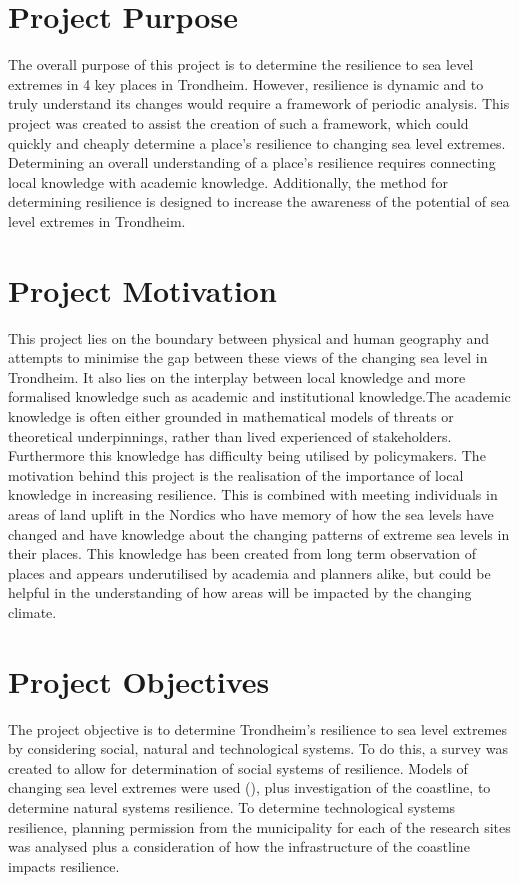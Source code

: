 \paragraph{}

\section{Project Purpose}
The overall purpose of this project is to determine the resilience to sea level extremes in 4 key places in Trondheim. However, resilience is dynamic and to truly understand its changes would require a framework of periodic analysis. This project was created to assist the creation of such a framework, which could quickly and cheaply determine a place's resilience to changing sea level extremes. Determining an overall understanding of a place's resilience requires connecting local knowledge with academic knowledge. Additionally, the method for determining resilience is designed to increase the awareness of the potential of sea level extremes in Trondheim. 

\section{Project Motivation}
 This project lies on the boundary between physical and human geography and attempts to minimise the gap between these views of the changing sea level in Trondheim. It also lies on the interplay between local knowledge and more formalised knowledge such as academic and institutional knowledge.The academic knowledge is often either grounded in mathematical models of threats or theoretical underpinnings, rather than lived experienced of stakeholders. Furthermore this knowledge has difficulty being utilised by policymakers. The motivation behind this project is the realisation of the importance of local knowledge in increasing resilience. This is combined with meeting individuals in areas of land uplift in the Nordics who have memory of how the sea levels have changed and have knowledge about the changing patterns of extreme sea levels in their places. This knowledge has been created from long term observation of places and appears underutilised by academia and planners alike, but could be helpful in the understanding of how areas will be impacted by the changing climate. 



\section{Project Objectives}
The project objective is to determine Trondheim's resilience to sea level extremes by considering social, natural and technological systems. To do this, a survey was created to allow for determination of social systems of resilience.  Models of changing sea level extremes were used (\cite{kartverket_se_2020}), plus investigation of the coastline, to determine natural systems resilience. To determine technological systems resilience, planning permission from the municipality for each of the research sites was analysed plus a consideration of how the infrastructure of the coastline impacts resilience.

